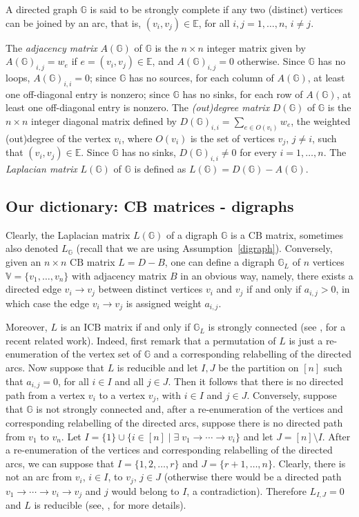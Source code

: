 \documentclass[ALCO]{cedram}
\newcommand{\mbg}{\mbox{$\mathbb{G}$}}
\newcommand{\mbv}{\mbox{$\mathbb{V}$}}
\newcommand{\mbe}{\mbox{$\mathbb{E}$}}
\newcommand{\icb}{\mbox{$\mathrm{ICB}$}}
\newcommand{\cb}{\mbox{$\mathrm{CB}$}}
\begin{document}
A directed graph $\mbg$ is said to be strongly complete if any two
(distinct) vertices can be joined by an arc, that is, $(v_i,v_j)\in
\mbe$, for all $i,j=1,\ldots ,n$, $i\neq j$.

The {\em adjacency matrix} $A(\mbg)$ of $\mbg$ is the $n\times n$
integer matrix given by $A(\mbg)_{i,j}=w_e$ if $e=(v_i,v_j)\in \mbe$,
and $A(\mbg)_{i,j}=0$ otherwise. Since $\mbg$ has no loops,
$A(\mbg)_{i,i}=0$; since $\mbg$ has no sources, for each column of
$A(\mbg)$, at least one off-diagonal entry is nonzero; since $\mbg$
has no sinks, for each row of $A(\mbg)$, at least one off-diagonal
entry is nonzero. The {\em (out)degree matrix} $D(\mbg)$ of $\mbg$ is
the $n\times n$ integer diagonal matrix defined by
$D(\mbg)_{i,i}=\sum_{e\in O(v_i)}w_e$, the weighted (out)degree of the
vertex $v_i$, where $O(v_i)$ is the set of vertices $v_j$, $j\neq i$,
such that $(v_i,v_j)\in \mbe$. Since $\mbg$ has no sinks,
$D(\mbg)_{i,i}\neq 0$ for every $i=1,\ldots, n$. The {\em Laplacian
  matrix} $L(\mbg)$ of $\mbg$ is defined as $L(\mbg)=D(\mbg)-A(\mbg)$.

\subsection{Our dictionary: CB matrices - digraphs}\label{dictionary}

Clearly, the Laplacian matrix $L(\mbg)$ of a digraph $\mbg$
is a $\cb$ matrix, sometimes also denoted $L_{\mathbb{G}}$ (recall
that we are using Assumption~\ref{digraph}). Conversely, given an
$n\times n$ $\cb$ matrix $L=D-B$, one can define a digraph $\mbg_L$ of
$n$ vertices $\mbv=\{v_1,\ldots ,v_n\}$ with adjacency matrix $B$ in
an obvious way, namely, there exists a directed edge $v_i\to v_j$
between distinct vertices $v_i$ and $v_j$ if and only if $a_{i,j}>0$,
in which case the edge $v_i\to v_j$ is assigned weight $a_{i,j}$.

Moreover, $L$ is an $\icb$ matrix if and only if $\mbg_L$ is strongly
connected (see \cite{cv}, for a recent related work). Indeed, first
remark that a permutation of $L$ is just a re-enumeration of the
vertex set of $\mbg$ and a corresponding relabelling of the directed
arcs. Now suppose that $L$ is reducible and let $I,J$ be the partition
on $[n]$ such that $a_{i,j}=0$, for all $i\in I$ and all $j\in
J$. Then it follows that there is no directed path from a vertex $v_i$
to a vertex $v_j$, with $i\in I$ and $j\in J$. Conversely, suppose
that $\mbg$ is not strongly connected and, after a re-enumeration of
the vertices and corresponding relabelling of the directed arcs,
suppose there is no directed path from $v_1$ to $v_n$. Let
$I=\{1\}\cup\{i\in [n]\mid \exists \; v_1\to\cdots\to v_i\}$ and let
$J=[n]\setminus I$. After a re-enumeration of the vertices and
corresponding relabelling of the directed arcs, we can suppose that
$I=\{1,2,\ldots ,r\}$ and $J=\{r+1,\ldots ,n\}$. Clearly, there is not
an arc from $v_i$, $i\in I$, to $v_j$, $j\in J$ (otherwise there would
be a directed path $v_1\to\cdots\to v_i\to v_j$ and $j$ would belong
to $I$, a contradiction). Therefore $L_{I,J}=0$ and $L$ is reducible
(see, \eg \cite[Theorem~3.2.1]{br}, for more details).
\end{document}
